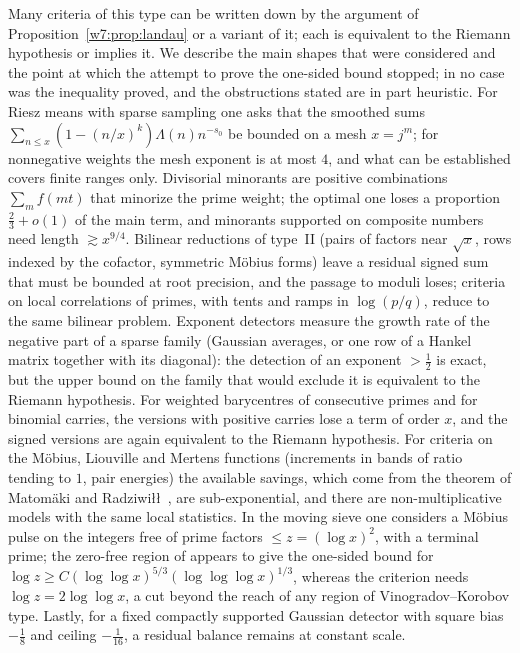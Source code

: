 \documentclass[11pt]{amsart}
\theoremstyle{definition}
\theoremstyle{remark}
\numberwithin{equation}{section}
\begin{document}
Many criteria of this type can be written down by the argument of Proposition~\ref{w7:prop:landau} or a
variant of it; each is equivalent to the Riemann hypothesis or implies it. We describe the main shapes that
were considered and the point at which the attempt to prove the one-sided bound stopped; in no case was the
inequality proved, and the obstructions stated are in part heuristic. For Riesz means with sparse sampling
one asks that the smoothed sums $\sum_{n\le x}(1-(n/x)^k)\Lambda(n)n^{-s_0}$ be bounded on a mesh $x=j^m$; for
nonnegative weights the mesh exponent is at most $4$, and what can be established covers finite ranges only.
Divisorial minorants are positive combinations $\sum_mf(mt)$ that minorize the prime weight; the optimal one
loses a proportion $\frac23+o(1)$ of the main term, and minorants supported on composite numbers need length
$\gtrsim x^{9/4}$. Bilinear reductions of type~II (pairs of factors near $\sqrt x$, rows indexed by the
cofactor, symmetric M\"obius forms) leave a residual signed sum that must be bounded at root precision, and
the passage to moduli loses; criteria on local correlations of primes, with tents and ramps in $\log(p/q)$,
reduce to the same bilinear problem. Exponent detectors measure the growth rate of the negative part of a
sparse family (Gaussian averages, or one row of a Hankel matrix together with its diagonal): the detection of
an exponent $>\frac12$ is exact, but the upper bound on the family that would exclude it is equivalent to the
Riemann hypothesis. For weighted barycentres of consecutive primes and for binomial carries, the versions with
positive carries lose a term of order $x$, and the signed versions are again equivalent to the Riemann
hypothesis. For criteria on the M\"obius, Liouville and Mertens functions (increments in bands of ratio tending
to $1$, pair energies) the available savings, which come from the theorem of Matom\"aki and Radziwi\l\l\
\cite{MatomakiRadziwill2016}, are sub-exponential, and there are non-multiplicative models with the same local
statistics. In the moving sieve one considers a M\"obius pulse on the integers free of prime factors
$\le z=(\log x)^2$, with a terminal prime; the zero-free region of \cite{Ford2002} appears to give the
one-sided bound for $\log z\ge C(\log\log x)^{5/3}(\log\log\log x)^{1/3}$, whereas the criterion needs
$\log z=2\log\log x$, a cut beyond the reach of any region of Vinogradov--Korobov type. Lastly, for a fixed
compactly supported Gaussian detector with square bias $-\frac18$ and ceiling $-\frac1{16}$, a residual balance
remains at constant scale.
\end{document}
